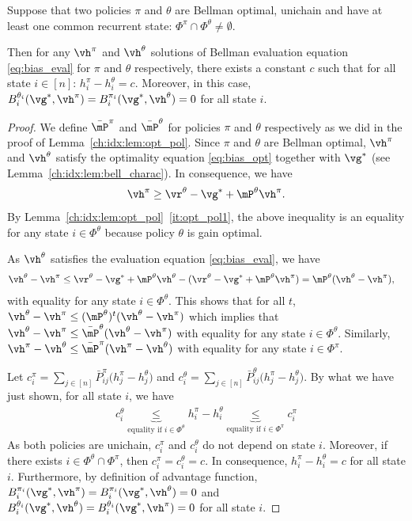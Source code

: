 \begin{lem}
    \label{ch:idx:lem:equi_bias}
    Suppose that two policies $\pi$ and $\theta$ are Bellman optimal, unichain and have at least one common recurrent state: $\Phi^\pi\cap\Phi^\theta\neq\emptyset$.
    
    Then for any $\vh^\pi$ and $\vh^\theta$ solutions of Bellman evaluation equation \eqref{eq:bias_eval} for $\pi$ and $\theta$ respectively, there exists a constant $c$ such that for all state $i\in[n]$: $h^\pi_i -h^\theta_i =c$. Moreover, in this case, ${B_i^{\theta_i}(\vg^*, \vh^\pi)=B_i^{\pi_i}(\vg^*, \vh^\theta)=0}$ for all state $i$.
\end{lem}
\begin{proof}
    We define $\bar{\mP}^\pi$ and $\bar{\mP}^\theta$ for policies $\pi$ and $\theta$ respectively as we did in the proof of Lemma~\ref{ch:idx:lem:opt_pol}.
    Since $\pi$ and $\theta$ are Bellman optimal, $\vh^\pi$ and $\vh^\theta$ satisfy the optimality equation \eqref{eq:bias_opt} together with $\vg^*$ (see Lemma~\ref{ch:idx:lem:bell_charac}).
    In consequence, we have
    \begin{align*}
        \vh^\pi \ge \vr^\theta -\vg^* +\mP^\theta\vh^\pi.
    \end{align*}
    By Lemma~\ref{ch:idx:lem:opt_pol}~\ref{it:opt_pol1}, the above inequality is an equality for any state $i\in\Phi^\theta$ because policy $\theta$ is gain optimal.

    As $\vh^\theta$ satisfies the evaluation equation \eqref{eq:bias_eval}, we have
    \begin{align*}
        \vh^\theta -\vh^\pi &\le \vr^\theta -\vg^* +\mP^\theta\vh^\theta -(\vr^\theta -\vg^* +\mP^\theta\vh^\pi) = \mP^\theta(\vh^\theta -\vh^\pi),
    \end{align*}
    with equality for any state $i\in\Phi^\theta$.
    This shows that for all $t$, $\vh^\theta -\vh^\pi\le (\mP^\theta)^t(\vh^\theta -\vh^\pi)$ which implies that $\vh^\theta -\vh^\pi\le \bar{\mP}^\theta(\vh^\theta -\vh^\pi)$ with equality for any state $i\in\Phi^\theta$.
    Similarly, $\vh^\pi -\vh^\theta \le \bar{\mP}^\pi(\vh^\pi -\vh^\theta)$ with equality for any state $i\in\Phi^\pi$.

    Let $c^\pi_i=\sum_{j\in[n]}\bar{P}^\pi_{ij}\Big(h^\pi_j-h^\theta_j\Big)$ and $c^\theta_i=\sum_{j\in[n]}\bar{P}^\theta_{ij}\Big(h^\pi_j-h^\theta_j\Big)$.
    By what we have just shown, for all state $i$, we have
    \begin{align*}
        c^\theta_i \underbrace{\le}_{\text{equality if $i\in\Phi^\theta$}} h^\pi_i-h^\theta_i \underbrace{\le}_{\text{equality if $i\in\Phi^\pi$}} c^\pi_i
    \end{align*}
    As both policies are unichain, $c^\pi_i$ and $c^\theta_i$ do not depend on state $i$.
    Moreover, if there exists $i\in\Phi^\theta\cap\Phi^\pi$, then $c^\pi_i=c^\theta_i = c$. In consequence,  $h^\pi_i-h^\theta_i=c$ for all state $i$. 
    Furthermore, by definition of advantage function, $B_i^{\pi_i}(\vg^*, \vh^\pi)=B_i^{\pi_i}(\vg^*, \vh^\theta)=0$ and $B_i^{\theta_i}(\vg^*, \vh^\theta)=B_i^{\theta_i}(\vg^*, \vh^\pi)=0$ for all state $i$.
\end{proof}

